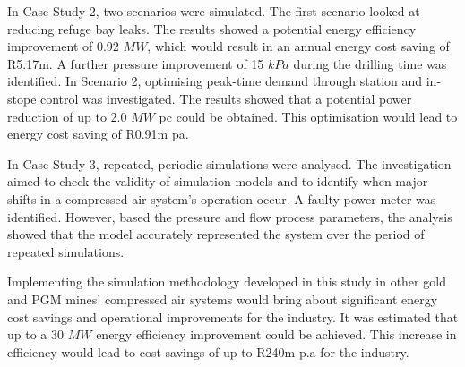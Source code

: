 	 \par
	 In Case Study 2, two scenarios were simulated. The first scenario looked at reducing refuge bay leaks. The results showed a potential energy efficiency improvement of 0.92 $MW$, which would result in an annual energy cost saving of R5.17m. A further pressure improvement of 15 $kPa$ during the drilling time was identified. In Scenario 2, optimising peak-time demand through station and in-stope control was investigated. The results showed that a potential power reduction of up to 2.0 $MW$ \gls{pc} could be obtained. This optimisation would lead to energy cost saving of R0.91m \gls{pa}.
	 \par 
	 In Case Study 3, repeated, periodic simulations were analysed. The investigation aimed to check the validity of simulation models and to identify when major shifts in a compressed air system’s operation occur. A faulty power meter was identified. However, based the pressure and flow process parameters, the analysis showed that the model accurately represented the system over the period of repeated simulations.
	 \par
	 Implementing the simulation methodology developed in this study in other gold and PGM mines' compressed air systems would  bring about significant energy cost savings and operational improvements for the industry. It was estimated that up to a 30 $MW$ energy efficiency improvement could be achieved. This increase in efficiency would lead to cost savings of up to R240m p.a for the industry. 
